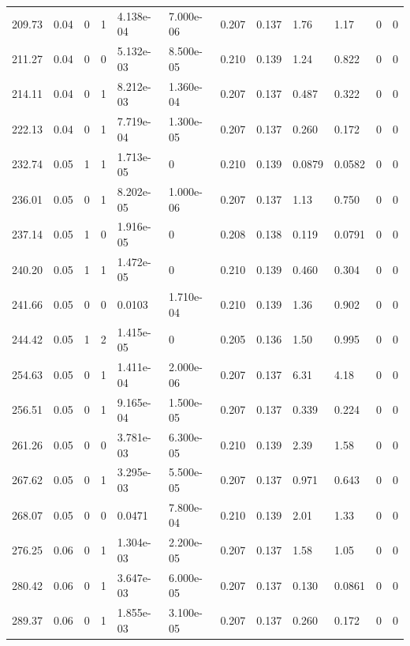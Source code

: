 \documentclass[preview]{standalone}
\begin{document}
{{{\begin{tabular}{L{1.2cm}C{1.2cm} C{0.3cm}C{0.5cm} C{1.4cm}C{1.4cm} C{1.4cm}C{1.4cm} C{1.6cm}C{1.6cm} C{1.6cm}C{1.6cm}}
  209.73  &  0.04  & 0     &  1 &  4.138e-04  & 7.000e-06  &  0.207&   0.137& 1.76 & 1.17   &  0 & 0  \\ 
  211.27  &  0.04  & 0     &  0 &  5.132e-03  & 8.500e-05  &  0.210&   0.139& 1.24 & 0.822   &  0 & 0  \\ 
  214.11  &  0.04  & 0     &  1 &  8.212e-03  & 1.360e-04  &  0.207&   0.137& 0.487 & 0.322   &  0 & 0  \\ 
  222.13  &  0.04  & 0     &  1 &  7.719e-04  & 1.300e-05  &  0.207&   0.137& 0.260 & 0.172   &  0 & 0  \\ 
  232.74  &  0.05  & 1     &  1 &  1.713e-05  & 0  &  0.210&   0.139& 0.0879 & 0.0582   &  0 & 0  \\ 
  236.01  &  0.05  & 0     &  1 &  8.202e-05  & 1.000e-06  &  0.207&   0.137& 1.13 & 0.750   &  0 & 0  \\ 
  237.14  &  0.05  & 1     &  0 &  1.916e-05  & 0  &  0.208&   0.138& 0.119 & 0.0791   &  0 & 0  \\ 
  240.20  &  0.05  & 1     &  1 &  1.472e-05  & 0  &  0.210&   0.139& 0.460 & 0.304   &  0 & 0  \\ 
  241.66  &  0.05  & 0     &  0 &  0.0103  & 1.710e-04  &  0.210&   0.139& 1.36 & 0.902   &  0 & 0  \\ 
  244.42  &  0.05  & 1     &  2 &  1.415e-05  & 0  &  0.205&   0.136& 1.50 & 0.995   &  0 & 0  \\ 
  254.63  &  0.05  & 0     &  1 &  1.411e-04  & 2.000e-06  &  0.207&   0.137& 6.31 & 4.18   &  0 & 0  \\ 
  256.51  &  0.05  & 0     &  1 &  9.165e-04  & 1.500e-05  &  0.207&   0.137& 0.339 & 0.224   &  0 & 0  \\ 
  261.26  &  0.05  & 0     &  0 &  3.781e-03  & 6.300e-05  &  0.210&   0.139& 2.39 & 1.58   &  0 & 0  \\ 
  267.62  &  0.05  & 0     &  1 &  3.295e-03  & 5.500e-05  &  0.207&   0.137& 0.971 & 0.643   &  0 & 0  \\ 
  268.07  &  0.05  & 0     &  0 &  0.0471  & 7.800e-04  &  0.210&   0.139& 2.01 & 1.33   &  0 & 0  \\ 
  276.25  &  0.06  & 0     &  1 &  1.304e-03  & 2.200e-05  &  0.207&   0.137& 1.58 & 1.05   &  0 & 0  \\ 
  280.42  &  0.06  & 0     &  1 &  3.647e-03  & 6.000e-05  &  0.207&   0.137& 0.130 & 0.0861   &  0 & 0  \\ 
  289.37  &  0.06  & 0     &  1 &  1.855e-03  & 3.100e-05  &  0.207&   0.137& 0.260 & 0.172   &  0 & 0  \\ 

\end{tabular}}}}
\end{document}
